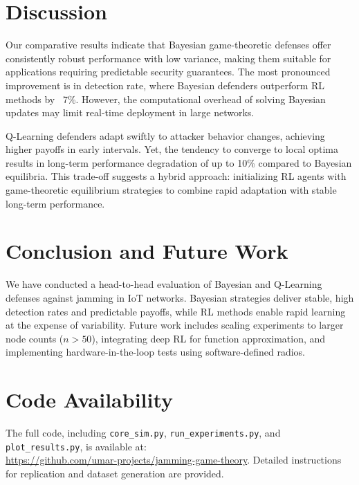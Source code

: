 \documentclass[conference]{IEEEtran}
\begin{document}
\section{Discussion}
Our comparative results indicate that Bayesian game-theoretic defenses offer consistently robust performance with low variance, making them suitable for applications requiring predictable security guarantees. The most pronounced improvement is in detection rate, where Bayesian defenders outperform RL methods by ~7\%. However, the computational overhead of solving Bayesian updates may limit real-time deployment in large networks.

Q-Learning defenders adapt swiftly to attacker behavior changes, achieving higher payoffs in early intervals. Yet, the tendency to converge to local optima results in long-term performance degradation of up to 10\% compared to Bayesian equilibria. This trade-off suggests a hybrid approach: initializing RL agents with game-theoretic equilibrium strategies to combine rapid adaptation with stable long-term performance.

\section{Conclusion and Future Work}
We have conducted a head-to-head evaluation of Bayesian and Q-Learning defenses against jamming in IoT networks. Bayesian strategies deliver stable, high detection rates and predictable payoffs, while RL methods enable rapid learning at the expense of variability. Future work includes scaling experiments to larger node counts ($n>50$), integrating deep RL for function approximation, and implementing hardware-in-the-loop tests using software-defined radios.

\section*{Code Availability}
The full code, including \texttt{core\_sim.py}, \texttt{run\_experiments.py}, and \texttt{plot\_results.py}, is available at:\\
\url{https://github.com/umar-projects/jamming-game-theory}. Detailed instructions for replication and dataset generation are provided.

\appendix
\end{document}
